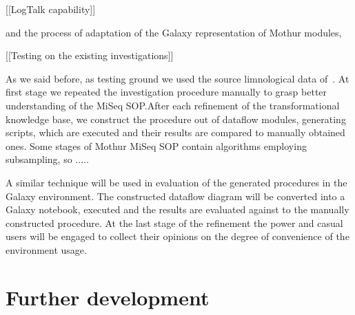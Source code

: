 \documentclass[a4paper]{jpconf}
\begin{document}
[[LogTalk capability]]

and the process of adaptation of the Galaxy representation of Mothur modules,

[[Testing on the existing investigations]]

As we said before, as testing ground we used the source limnological data of~\cite{mik19}.  At first stage we repeated the investigation procedure manually to grasp better understanding of the MiSeq SOP.\@  After each refinement of the transformational knowledge base, we construct the procedure out of dataflow modules, generating scripts, which are executed and their results are compared to manually obtained ones.  Some stages of Mothur MiSeq SOP contain algorithms employing subsampling, so .....

A similar technique will be used in evaluation of the generated procedures in the Galaxy environment.  The constructed dataflow diagram will be converted into a Galaxy notebook, executed and the results are evaluated against to the manually constructed procedure.  At the last stage of the refinement the power and casual users will be engaged to collect their opinions on the degree of convenience of the environment usage.

\section{Further development}\label{sec:further}
\end{document}
